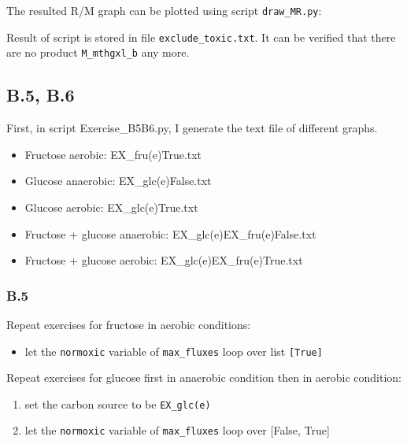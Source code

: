 \documentclass[]{article}
\newenvironment{Shaded}{}{}
\newcommand{\ExtensionTok}[1]{#1}
\newcommand{\NormalTok}[1]{#1}
\begin{document}
The resulted R/M graph can be plotted using script \texttt{draw\_MR.py}:

\begin{Shaded}
\end{Shaded}

Result of script is stored in file \texttt{exclude\_toxic.txt}. It can
be verified that there are no product \texttt{M\_mthgxl\_b} any more.

\hypertarget{header-n188}{%
\subsection{B.5, B.6}\label{header-n188}}

First, in script Exercise\_B5B6.py, I generate the text file of
different graphs.

\begin{itemize}
\item
  Fructose aerobic: EX\_fru(e)True.txt
\item
  Glucose anaerobic: EX\_glc(e)False.txt
\item
  Glucose aerobic: EX\_glc(e)True.txt
\item
  Fructose + glucose anaerobic: EX\_glc(e)EX\_fru(e)False.txt
\item
  Fructose + glucose aerobic: EX\_glc(e)EX\_fru(e)True.txt
\end{itemize}

\hypertarget{header-n207}{%
\subsubsection{B.5}\label{header-n207}}

Repeat exercises for fructose in aerobic conditions:

\begin{itemize}
\item
  let the \texttt{normoxic} variable of \texttt{max\_fluxes} loop over
  list \texttt{{[}True{]}}
\end{itemize}

Repeat exercises for glucose first in anaerobic condition then in
aerobic condition:

\begin{enumerate}
\def\labelenumi{\arabic{enumi}.}
\item
  set the carbon source to be \texttt{EX\_glc(e)}
\item
  let the \texttt{normoxic} variable of \texttt{max\_fluxes} loop over
  {[}False, True{]}
\end{enumerate}
\end{document}
